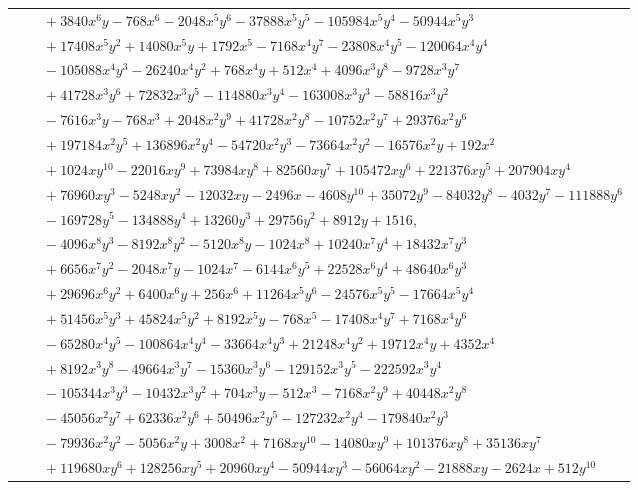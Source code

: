 \documentclass[11pt]{article}
\begin{document}
\begin{longtable}{@{}ll@{}}
 & $\quad +3840x^{6}y-768x^{6}-2048x^{5}y^{6}-37888x^{5}y^{5}-105984x^{5}y^{4}-50944x^{5}y^{3}$\\
 & $\quad +17408x^{5}y^{2}+14080x^{5}y+1792x^{5}-7168x^{4}y^{7}-23808x^{4}y^{5}-120064x^{4}y^{4}$\\
 & $\quad -105088x^{4}y^{3}-26240x^{4}y^{2}+768x^{4}y+512x^{4}+4096x^{3}y^{8}-9728x^{3}y^{7}$\\
 & $\quad +41728x^{3}y^{6}+72832x^{3}y^{5}-114880x^{3}y^{4}-163008x^{3}y^{3}-58816x^{3}y^{2}$\\
 & $\quad -7616x^{3}y-768x^{3}+2048x^{2}y^{9}+41728x^{2}y^{8}-10752x^{2}y^{7}+29376x^{2}y^{6}$\\
 & $\quad +197184x^{2}y^{5}+136896x^{2}y^{4}-54720x^{2}y^{3}-73664x^{2}y^{2}-16576x^{2}y+192x^{2}$\\
 & $\quad +1024xy^{10}-22016xy^{9}+73984xy^{8}+82560xy^{7}+105472xy^{6}+221376xy^{5}+207904xy^{4}$\\
 & $\quad +76960xy^{3}-5248xy^{2}-12032xy-2496x-4608y^{10}+35072y^{9}-84032y^{8}-4032y^{7}-111888y^{6}$\\
 & $\quad -169728y^{5}-134888y^{4}+13260y^{3}+29756y^{2}+8912y+1516,$\\
 & $\quad -4096x^{8}y^{3}-8192x^{8}y^{2}-5120x^{8}y-1024x^{8}+10240x^{7}y^{4}+18432x^{7}y^{3}$\\
 & $\quad +6656x^{7}y^{2}-2048x^{7}y-1024x^{7}-6144x^{6}y^{5}+22528x^{6}y^{4}+48640x^{6}y^{3}$\\
 & $\quad +29696x^{6}y^{2}+6400x^{6}y+256x^{6}+11264x^{5}y^{6}-24576x^{5}y^{5}-17664x^{5}y^{4}$\\
 & $\quad +51456x^{5}y^{3}+45824x^{5}y^{2}+8192x^{5}y-768x^{5}-17408x^{4}y^{7}+7168x^{4}y^{6}$\\
 & $\quad -65280x^{4}y^{5}-100864x^{4}y^{4}-33664x^{4}y^{3}+21248x^{4}y^{2}+19712x^{4}y+4352x^{4}$\\
 & $\quad +8192x^{3}y^{8}-49664x^{3}y^{7}-15360x^{3}y^{6}-129152x^{3}y^{5}-222592x^{3}y^{4}$\\
 & $\quad -105344x^{3}y^{3}-10432x^{3}y^{2}+704x^{3}y-512x^{3}-7168x^{2}y^{9}+40448x^{2}y^{8}$\\
 & $\quad -45056x^{2}y^{7}+62336x^{2}y^{6}+50496x^{2}y^{5}-127232x^{2}y^{4}-179840x^{2}y^{3}$\\
 & $\quad -79936x^{2}y^{2}-5056x^{2}y+3008x^{2}+7168xy^{10}-14080xy^{9}+101376xy^{8}+35136xy^{7}$\\
 & $\quad +119680xy^{6}+128256xy^{5}+20960xy^{4}-50944xy^{3}-56064xy^{2}-21888xy-2624x+512y^{10}$\\

\end{longtable}
\end{document}

